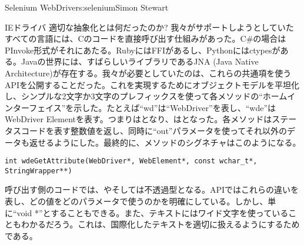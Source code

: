 \begin{aosachapter}{Selenium WebDriver}{s:selenium}{Simon Stewart}
\begin{aosasect1}{IEドライバ}
適切な抽象化とは何だったのか? 我々がサポートしようとしていたすべての言語には、Cのコードを直接呼び出す仕組みがあった。C\#の場合はPInvoke形式がそれにあたる。RubyにはFFIがあるし、Pythonにはctypesがある。Javaの世界には、すばらしいライブラリであるJNA (Java Native Architecture)が存在する。我々が必要としていたのは、これらの共通項を使うAPIを公開することだった。これを実現するためにオブジェクトモデルを平坦化し、シンプルな2文字か3文字のプレフィックスを使って各メソッドの``ホームインターフェイス''を示した。たとえば``wd''は``WebDriver''を表し、``wde''はWebDriver Elementを表す。つまりはとなり、はとなった。各メソッドはステータスコードを表す整数値を返し、同時に``out''パラメータを使ってそれ以外のデータも返せるようにした。最終的に、メソッドのシグネチャはこのようになる。

\begin{verbatim}
int wdeGetAttribute(WebDriver*, WebElement*, const wchar_t*, StringWrapper**)
\end{verbatim}

\noindent 呼び出す側のコードでは、やそしては不透過型となる。APIではこれらの違いを表し、どの値をどのパラメータで使うのかを明確にしている。しかし、単に``void *''とすることもできる。また、テキストにはワイド文字を使っていることもわかるだろう。これは、国際化したテキストを適切に扱えるようにするためである。


\end{aosasect1}
\end{aosachapter}
